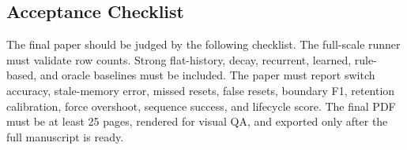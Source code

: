\documentclass{article}
\begin{document}
\subsection{Acceptance Checklist}

The final paper should be judged by the following checklist. The full-scale
runner must validate row counts. Strong flat-history, decay, recurrent, learned,
rule-based, and oracle baselines must be included. The paper must report switch
accuracy, stale-memory error, missed resets, false resets, boundary F1,
retention calibration, force overshoot, sequence success, and lifecycle score.
The final PDF must be at least 25 pages, rendered for visual QA, and exported
only after the full manuscript is ready.



\end{document}
